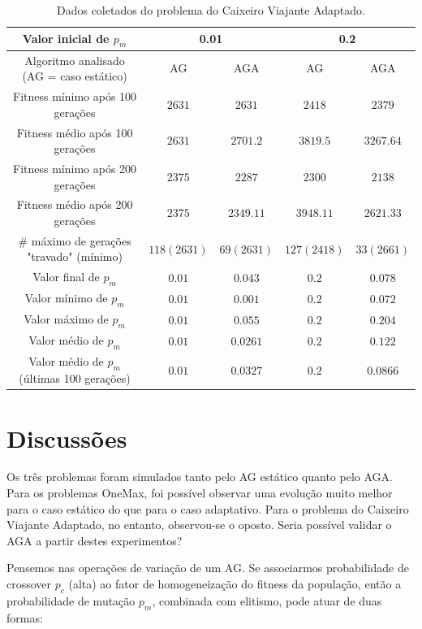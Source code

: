 \begin{table}
\caption{Dados coletados do problema do Caixeiro Viajante Adaptado.}
\label{tab:tsp}

\centering
\begin{tabular}[!hbt]{|c|cc|cc|}
	\hline
	Valor inicial de $p_m$						& \multicolumn{2}{c|}{0.01}		& \multicolumn{2}{c|}{0.2}		\\
	\hline
	Algoritmo analisado (AG = caso estático)	& AG			& AGA			& AG			& AGA			\\
	\hline
	Fitness mínimo após 100 gerações			& $2631$		& $2631$		& $2418$		& $2379$		\\
	Fitness médio após 100 gerações				& $2631$		& $2701.2$		& $3819.5$		& $3267.64$		\\
	Fitness mínimo após 200 gerações 			& $2375$		& $2287$		& $2300$		& $2138$		\\
	Fitness médio após 200 gerações 			& $2375$		& $2349.11$		& $3948.11$		& $2621.33$		\\
	\# máximo de gerações "travado" (mínimo)	& $118 (2631)$	& $69 (2631)$	& $127 (2418)$	& $33 (2661)$	\\
	Valor final de $p_m$						& $0.01$		& $0.043$		& $0.2$			& $0.078$		\\
	Valor mínimo de $p_m$						& $0.01$		& $0.001$		& $0.2$			& $0.072$		\\
	Valor máximo de $p_m$						& $0.01$		& $0.055$		& $0.2$			& $0.204$		\\
	Valor médio de $p_m$						& $0.01$		& $0.0261$		& $0.2$			& $0.122$		\\
	Valor médio de $p_m$ (últimas 100 gerações)	& $0.01$		& $0.0327$		& $0.2$			& $0.0866$		\\
	\hline
\end{tabular}
\end{table}

\section{Discussões}

Os três problemas foram simulados tanto pelo AG estático quanto pelo AGA. Para os problemas OneMax, foi possível observar uma evolução muito melhor para o caso estático do que para o caso adaptativo. Para o problema do Caixeiro Viajante Adaptado, no entanto, observou-se o oposto. Seria possível validar o AGA a partir destes experimentos?

Pensemos nas operações de variação de um AG. Se associarmos probabilidade de crossover $p_c$ (alta) ao fator de homogeneização do fitness da população, então a probabilidade de mutação $p_m$, combinada com elitismo, pode atuar de duas formas:

